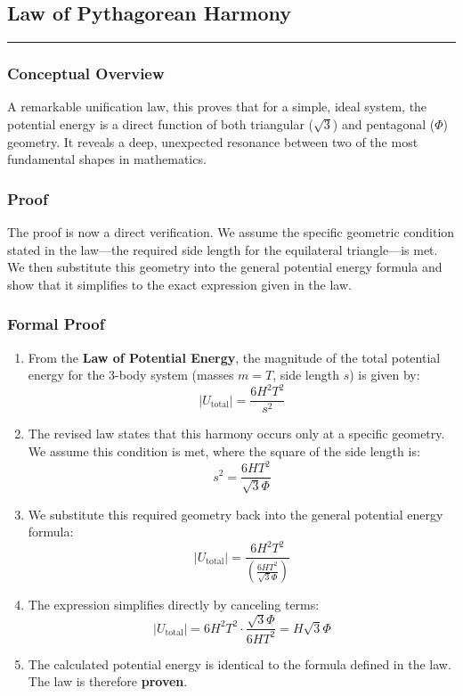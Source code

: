 \subsection*{Law of Pythagorean Harmony}
\hrule
\vspace{0.3cm}
\vspace{0.5cm}

\subsubsection*{Conceptual Overview}
A remarkable unification law, this proves that for a simple, ideal system, the potential energy is a direct function of both triangular ($\sqrt{3}$) and pentagonal ($\Phi$) geometry. It reveals a deep, unexpected resonance between two of the most fundamental shapes in mathematics.

\subsubsection*{Proof}
The proof is now a direct verification. We assume the specific geometric condition stated in the law—the required side length for the equilateral triangle—is met. We then substitute this geometry into the general potential energy formula and show that it simplifies to the exact expression given in the law.

\subsubsection*{Formal Proof}
\begin{enumerate}
    \item From the \textbf{Law of Potential Energy}, the magnitude of the total potential energy for the 3-body system (masses $m=T$, side length $s$) is given by:
    $$ |U_{\text{total}}| = \frac{6H^2T^2}{s^2} $$
    
    \item The revised law states that this harmony occurs only at a specific geometry. We assume this condition is met, where the square of the side length is:
    $$ s^2 = \frac{6HT^2}{\sqrt{3}\Phi} $$
    
    \item We substitute this required geometry back into the general potential energy formula:
    $$ |U_{\text{total}}| = \frac{6H^2T^2}{\left(\frac{6HT^2}{\sqrt{3}\Phi}\right)} $$
    
    \item The expression simplifies directly by canceling terms:
    $$ |U_{\text{total}}| = 6H^2T^2 \cdot \frac{\sqrt{3}\Phi}{6HT^2} = H\sqrt{3}\Phi $$
    
    \item The calculated potential energy is identical to the formula defined in the law. The law is therefore \textbf{proven}.
\end{enumerate}

